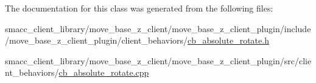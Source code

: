The documentation for this class was generated from the following files\+:\begin{DoxyCompactItemize}
\item 
smacc\+\_\+client\+\_\+library/move\+\_\+base\+\_\+z\+\_\+client/move\+\_\+base\+\_\+z\+\_\+client\+\_\+plugin/include/move\+\_\+base\+\_\+z\+\_\+client\+\_\+plugin/client\+\_\+behaviors/\hyperlink{cb__absolute__rotate_8h}{cb\+\_\+absolute\+\_\+rotate.\+h}\item 
smacc\+\_\+client\+\_\+library/move\+\_\+base\+\_\+z\+\_\+client/move\+\_\+base\+\_\+z\+\_\+client\+\_\+plugin/src/client\+\_\+behaviors/\hyperlink{cb__absolute__rotate_8cpp}{cb\+\_\+absolute\+\_\+rotate.\+cpp}\end{DoxyCompactItemize}
